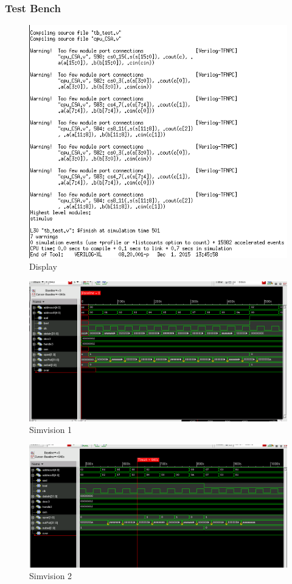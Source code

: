 \documentclass[12pt]{article}
\begin{document}
\subsubsection{Test Bench}
\begin{figure}[H]
\centering
\includegraphics[width=.7\linewidth]{../CSA/tbtest-text}
\caption{Display}
\label{fig:tbtest-text}
\end{figure}
\begin{figure}[H]
\centering
\includegraphics[width=\linewidth]{../CSA/test1}
\caption{Simvision 1}
\label{fig:test1}
\end{figure}
\begin{figure}[H]
\centering
\includegraphics[width=\linewidth]{../CSA/test2}
\caption{Simvision 2}
\label{fig:test2}
\end{figure}
\end{document}
